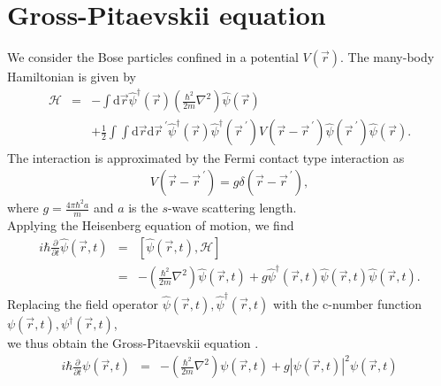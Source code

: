 \documentclass[12pt,a4paper]{report} %
\newcommand{\diff}{\mathrm{d}}				%
\begin{document}
\section{Gross-Pitaevskii equation}
We consider the Bose particles confined in a potential $V(\vec{r})$.
The many-body Hamiltonian is given by
\begin{eqnarray}
\mathcal{H} & = & - \int \diff \vec{r} \hat{\psi}^\dagger (\vec{r}) \left (\frac{\hbar^2}{2m} \nabla^2 \right)
\hat{\psi}(\vec{r}) \nonumber
\\
& & + \frac{1}{2} \int \int \diff \vec{r} \diff \vec{r}^{\ \prime} \hat{\psi}^\dagger( \vec{r} ) \hat{\psi}^\dagger( \vec{r}^{\ \prime} )
V (\vec{r} - \vec{r}^{\ \prime} ) \hat{\psi}( \vec{r}^{\ \prime} ) \hat{\psi}( \vec{r} ).
\end{eqnarray}
The interaction is approximated by the Fermi contact type interaction as
\begin{eqnarray}
V (\vec{r} - \vec{r}^{\ \prime} ) = g \delta (\vec{r} - \vec{r}^{\ \prime}),
\end{eqnarray}
where  $g = \frac{4 \pi \hbar^2 a}{m}$
and $a$ is the $s$-wave scattering length.
\\
Applying the Heisenberg equation of motion, we find
\begin{eqnarray}
i \hbar \frac{\partial}{\partial t} \hat{\psi} ( \vec{r}, t ) & = & \left[ \hat{\psi} ( \vec{r}, t ), \mathcal{H} \right] \nonumber
\\
& = & - \left( \frac{\hbar^2}{2m} \nabla^2 \right) \hat{\psi} ( \vec{r}, t )
+ g \hat{\psi}^\dagger (\vec{r}, t) \hat{\psi}( \vec{r}, t) \hat{\psi}( \vec{r}, t ).
\end{eqnarray}
Replacing the field operator $\hat{\psi}(\vec{r},t),\hat{\psi}^\dagger(\vec{r},t)$ with the c-number function
$\psi(\vec{r},t),\psi^\dagger(\vec{r},t)$,
\\
we thus obtain the Gross-Pitaevskii equation \cite{17}.
\begin{eqnarray}
i \hbar \frac{\partial}{\partial t} \psi ( \vec{r}, t ) & = & 
- \left( \frac{\hbar^2}{2m} \nabla^2 \right) \psi( \vec{r}, t)
+ g | \psi(\vec{r}, t) |^2 \psi( \vec{r}, t )
\end{eqnarray}
\end{document}
